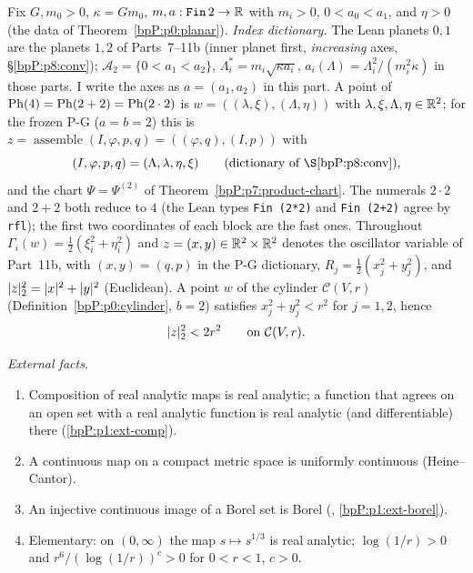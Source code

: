 Fix $G,m_0>0$, $\kappa=Gm_0$, $m,a:\texttt{Fin}\,2\to\mathbb{R}$ with $m_i>0$, $0<a_0<a_1$, and $\eta>0$ (the data of Theorem~\ref{bpP:p0:planar}). \emph{Index dictionary.} The Lean planets $0,1$ are the planets $1,2$ of Parts~7--11b (inner planet first, \emph{increasing} axes, \S\ref{bpP:p8:conv}); $\mathcal A_2=\{0<a_1<a_2\}$, $\Lambda_i^*=m_i\sqrt{\kappa a_i}$, $a_i(\Lambda)=\Lambda_i^2/(m_i^2\kappa)$ in those parts. I write the axes as $a=(a_1,a_2)$ in this part. A point of $\mathrm{Ph}(4)=\mathrm{Ph}(2+2)=\mathrm{Ph}(2\cdot2)$ is $w=((\lambda,\xi),(\Lambda,\eta))$ with $\lambda,\xi,\Lambda,\eta\in\mathbb{R}^2$; for the frozen P-G ($a=b=2$) this is $z=\operatorname{assemble}(I,\varphi,p,q)=((\varphi,q),(I,p))$ with
\[(I,\varphi,p,q)=(\Lambda,\lambda,\eta,\xi)\qquad(\text{dictionary of \S\ref{bpP:p8:conv}}),\]
and the chart $\Psi=\Psi^{(2)}$ of Theorem~\ref{bpP:p7:product-chart}. The numerals $2\cdot2$ and $2+2$ both reduce to $4$ (the Lean types \texttt{Fin (2*2)} and \texttt{Fin (2+2)} agree by \texttt{rfl}); the first two coordinates of each block are the fast ones. Throughout $\Gamma_i(w)=\tfrac12(\xi_i^2+\eta_i^2)$ and $z=(x,y)\in\mathbb{R}^2\times\mathbb{R}^2$ denotes the oscillator variable of Part~11b, with $(x,y)=(q,p)$ in the P-G dictionary, $R_j=\tfrac12(x_j^2+y_j^2)$, and $\lvert z\rvert_2^2=\lvert x\rvert^2+\lvert y\rvert^2$ (Euclidean). A point $w$ of the cylinder $\mathcal C(V,r)$ (Definition~\ref{bpP:p0:cylinder}, $b=2$) satisfies $x_j^2+y_j^2<r^2$ for $j=1,2$, hence
\begin{equation}\label{bpP:p12:eq:cylnorm}
\lvert z\rvert_2^2<2r^2\qquad\text{on }\mathcal C(V,r).
\end{equation}

\emph{External facts.}
\begin{enumerate}[label=(F\arabic*),ref=(F\arabic*)]
\item\label{bpP:p12:f-comp} Composition of real analytic maps is real analytic; a function that agrees on an open set with a real analytic function is real analytic (and differentiable) there (\ref{bpP:p1:ext-comp}).
\item\label{bpP:p12:f-unif} A continuous map on a compact metric space is uniformly continuous (Heine--Cantor).
\item\label{bpP:p12:f-borel} An injective continuous image of a Borel set is Borel (, \ref{bpP:p1:ext-borel}).
\item\label{bpP:p12:f-mono} Elementary: on $(0,\infty)$ the map $s\mapsto s^{1/3}$ is real analytic; $\log(1/r)>0$ and $r^6/(\log(1/r))^c>0$ for $0<r<1$, $c>0$.
\end{enumerate}

